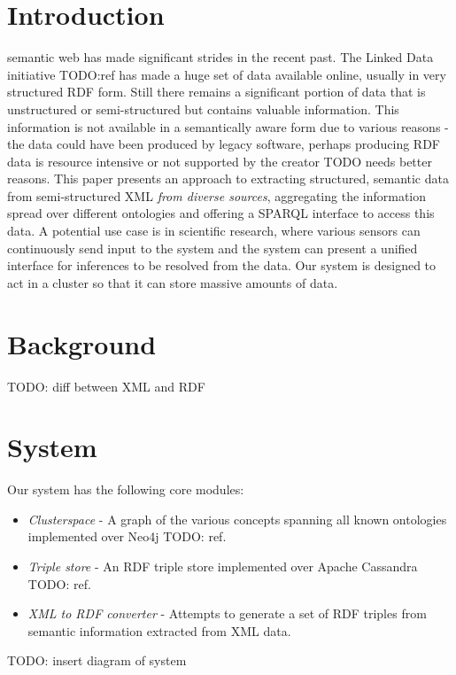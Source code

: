 \documentclass[conference]{IEEEtran}
\begin{document}
\section{Introduction}
 semantic web has made significant strides in the recent
past. The Linked Data initiative TODO:ref has made a huge set of data available
online, usually in very structured RDF form. Still there remains a significant
portion of data that is unstructured or semi-structured but contains valuable
information. This information is not available in a semantically aware form due
to various reasons - the data could have been produced by legacy software,
perhaps producing RDF data is resource intensive or not supported by the
creator TODO needs better reasons. This paper presents an approach to
extracting structured, semantic data from semi-structured XML \emph{from
diverse sources}, aggregating the information spread over different ontologies
and offering a SPARQL interface to access this data. A potential use case is in
scientific research, where various sensors can continuously send input to the
system and the system can present a unified interface for inferences to be
resolved from the data. Our system is designed to act in a cluster so that it
can store massive amounts of data.

\section{Background}
\label{sec:background}

TODO: diff between XML and RDF

\section{System}
Our system has the following core modules:

\begin{itemize}
    \item \emph{Clusterspace} - A graph of the various concepts spanning all
        known ontologies implemented over Neo4j TODO: ref.
    \item \emph{Triple store} - An RDF triple store implemented over Apache
        Cassandra TODO: ref.
    \item \emph{XML to RDF converter} - Attempts to generate a set of RDF
        triples from semantic information extracted from XML data.
\end{itemize}

TODO: insert diagram of system
\end{document}
